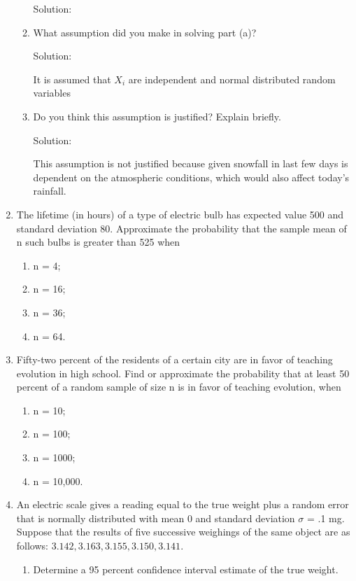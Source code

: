 \documentclass{article}
\begin{document}
\begin{enumerate}
\begin{enumerate}
        Solution:

        \item What assumption did you make in solving part (a)?
        
        Solution:

        It is assumed that $X_i$ are independent and normal distributed random variables
        \item Do you think this assumption is justified? Explain briefly.
        
        Solution:

        This assumption is not justified because given snowfall in last few days is dependent on the atmospheric conditions, which would also affect today's rainfall.
    \end{enumerate}
    \item  The lifetime (in hours) of a type of electric bulb has expected value 500 and standard deviation 80. 
    Approximate the probability that the sample mean of n such bulbs is greater than 525 when
    \begin{enumerate}
        \item n = 4;
        \item n = 16;
        \item n = 36;
        \item n = 64.
    \end{enumerate}
    \item Fifty-two percent of the residents of a certain city are in favor of teaching evolution in high school. Find or approximate the probability that at least 50 percent of a random sample of size n is in favor of teaching evolution, when
    \begin{enumerate}
        \item n = 10;
        \item n = 100;
        \item n = 1000;
        \item n = 10,000.
    \end{enumerate}
    \item An electric scale gives a reading equal to the true weight plus a random error that is normally distributed with mean 0 and standard deviation $\sigma$ = .1 mg. Suppose that the results of five successive weighings of the same object are as follows: $3.142, 3.163, 3.155, 3.150, 3.141$.
    \begin{enumerate}
        \item Determine a 95 percent confidence interval estimate of the true weight.

\end{enumerate}
\end{enumerate}
\end{document}
